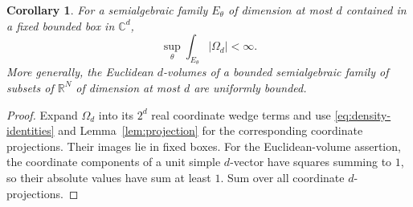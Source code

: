 \documentclass[11pt]{article}
\numberwithin{equation}{section}
\newtheorem{corollary}[theorem]{Corollary}
\theoremstyle{definition}
\theoremstyle{remark}
\newcommand{\C}{\mathbb C}
\newcommand{\R}{\mathbb R}
\newcommand{\OmegaD}{\Omega_d}
\begin{document}
\begin{corollary}\label{cor:bounded-volume}
For a semialgebraic family $E_\theta$ of dimension at most $d$ contained
in a fixed bounded box in $\C^d$,
\[
 \sup_\theta\int_{E_\theta}|\OmegaD|<\infty.
\]
More generally, the Euclidean $d$-volumes of a bounded semialgebraic family
of subsets of $\R^N$ of dimension at most $d$ are uniformly bounded.
\end{corollary}
\begin{proof}
Expand $\OmegaD$ into its $2^d$ real coordinate wedge terms and use
\eqref{eq:density-identities} and Lemma~\ref{lem:projection} for the
corresponding coordinate projections. Their images lie in fixed boxes.
For the Euclidean-volume assertion, the coordinate components of a unit
simple $d$-vector have squares summing to $1$, so their absolute values
have sum at least $1$. Sum over all coordinate $d$-projections.
\end{proof}
\end{document}
